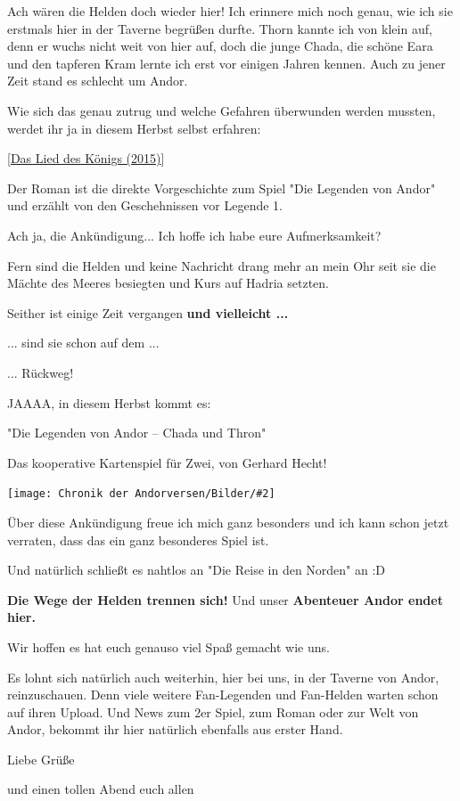 \documentclass[10pt, a4paper, oneside]{book}
\newcommand{\refprodukt}[1]{\hyperref[Produkt: #1]{#1}}
\newcommand{\bildmitts}[2][height=0.32\textwidth,width=0.48\textwidth,keepaspectratio]{%
    \begin{center}
        \texttt{[image: Chronik der Andorversen/Bilder/\#2]}
    \end{center}
}
\begin{document}
\begin{multicols}{2}
Ach wären die Helden doch wieder hier! Ich erinnere mich noch genau, wie ich sie erstmals hier in der Taverne begrüßen durfte. Thorn kannte ich von klein auf, denn er wuchs nicht weit von hier auf, doch die junge Chada, die schöne Eara und den tapferen Kram lernte ich erst vor einigen Jahren kennen. Auch zu jener Zeit stand es schlecht um Andor.

Wie sich das genau zutrug und welche Gefahren überwunden werden mussten, werdet ihr ja in diesem Herbst selbst erfahren:

[\refprodukt{Das Lied des Königs (2015)}]

Der Roman ist die direkte Vorgeschichte zum Spiel "Die Legenden von Andor" und erzählt von den Geschehnissen vor Legende 1.


Ach ja, die Ankündigung... Ich hoffe ich habe eure Aufmerksamkeit?

Fern sind die Helden und keine Nachricht drang mehr an mein Ohr seit sie die Mächte des Meeres besiegten und Kurs auf Hadria setzten.

Seither ist einige Zeit vergangen \textbf{und vielleicht ...}

... sind sie schon auf dem ...

... Rückweg!

JAAAA, in diesem Herbst kommt es:

"Die Legenden von Andor – Chada und Thron"

Das kooperative Kartenspiel für Zwei, von Gerhard Hecht!

\bildmitts{AA2015 Die Wege trennen sich 1.jpeg}

Über diese Ankündigung freue ich mich ganz besonders und ich kann schon jetzt verraten, dass das ein ganz besonderes Spiel ist.

Und natürlich schließt es nahtlos an "Die Reise in den Norden" an :D 

\textbf{Die Wege der Helden trennen sich!} Und unser \textbf{Abenteuer Andor endet hier.}

Wir hoffen es hat euch genauso viel Spaß gemacht wie uns.

Es lohnt sich natürlich auch weiterhin, hier bei uns, in der Taverne von Andor, reinzuschauen. Denn viele weitere Fan-Legenden und Fan-Helden warten schon auf ihren Upload. Und News zum 2er Spiel, zum Roman oder zur Welt von Andor, bekommt ihr hier natürlich ebenfalls aus erster Hand.


Liebe Grüße

und einen tollen Abend euch allen


\end{multicols}
\end{document}
